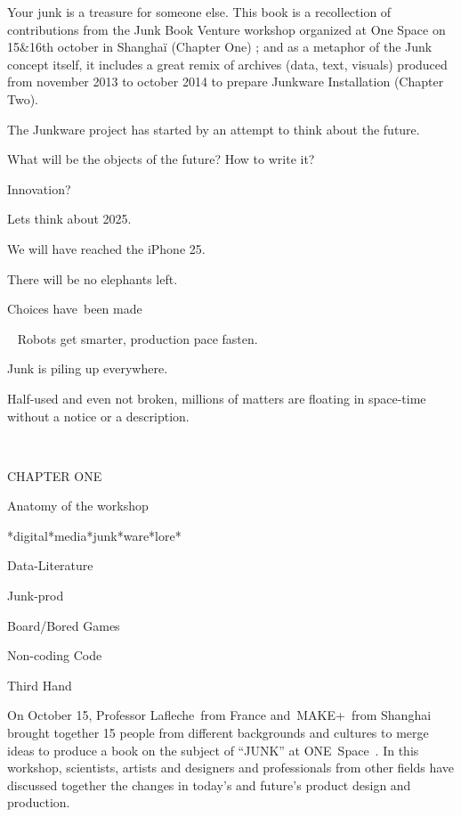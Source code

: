 Your junk is a treasure for someone else. \newline
\newline
This book is a recollection of contributions from the Junk Book Venture
workshop organized at One Space on 15\&16th october in Shangha\"i
(Chapter One) ; and as a metaphor of the Junk concept itself, it
includes a great remix of archives (data, text, visuals) produced from
november 2013 to october 2014 to prepare Junkware Installation (Chapter
Two).


The {\textquotedbl}Junkware{\textquotedbl} project has started by an
attempt to think about the future.

What will be the objects of the future? How to write it?

Innovation?

Let{\textquotesingle}s think about 2025.

We will have reached the iPhone 25.~

There will be no elephants left.

Choices have~been made

~
Robots get smarter, production pace fasten. 

Junk is piling up everywhere.


\bigskip

Half-used and even not broken, 
millions of matters are floating in space-time without a notice or a
description.~

~

\bigskip

CHAPTER ONE

 Anatomy of the workshop

 *digital*media*junk*ware*lore*

 Data-Literature

 Junk-prod

 Board/Bored Games

 Non-coding Code

 Third Hand


On October 15, Professor Lafleche~from France and~MAKE+~from Shanghai
brought together 15 people from different backgrounds and cultures to
merge ideas to produce a book on the subject of
{\textquotedblleft}JUNK{\textquotedblright} at ONE~Space~. In this
workshop, scientists, artists and designers and professionals from
other fields have discussed together the changes in
today{\textquoteright}s and future{\textquoteright}s product design and
production.

